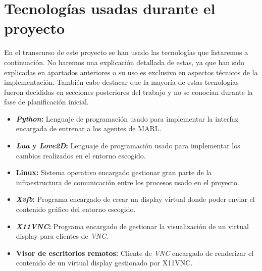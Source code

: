 \section{Tecnologías usadas durante el proyecto}

En el transcurso de este proyecto se han usado las tecnologías que listaremos a continuación. No haremos una explicación detallada de estas, ya que han sido explicadas en apartados anteriores o su uso es exclusivo en aspectos técnicos de la implementación. También cabe destacar que la mayoría de estas tecnologías fueron decididas en secciones posteriores del trabajo y no se conocían durante la fase de planificación inicial.

\begin{itemize}
    \item \textbf{\textit{Python}:} Lenguaje de programación usado para implementar la interfaz encargada de entrenar a los agentes de MARL.
    \item \textbf{\textit{Lua} y \textit{Love2D}:} Lenguaje de programación usado para implementar los cambios realizados en el entorno escogido.
    \item \textbf{Linux:} Sistema operativo encargado gestionar gran parte de la infraestructura de comunicación entre los procesos usado en el proyecto.
    \item \textbf{\textit{Xvfb}:} Programa encargado de crear un display virtual donde poder enviar el contenido gráfico del entorno escogido.
    \item \textbf{\textit{X11VNC}:} Programa encargado de gestionar la visualización de un virtual display para clientes de \textit{VNC}.
    \item \textbf{Visor de escritorios remotos:} Cliente de \textit{VNC} encargado de renderizar el contenido de un virtual display gestionado por X11VNC.
\end{itemize}

